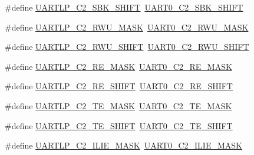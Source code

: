 \begin{DoxyCompactItemize}
\item 
\#define \hyperlink{group___backward___compatibility___symbols_ga7753cf443cbaa9e904cbd69211913709}{U\+A\+R\+T\+L\+P\+\_\+\+C2\+\_\+\+S\+B\+K\+\_\+\+S\+H\+I\+FT}~\hyperlink{group___u_a_r_t0___register___masks_gaa10ba8ef529e39693f0e8101fdec07fc}{U\+A\+R\+T0\+\_\+\+C2\+\_\+\+S\+B\+K\+\_\+\+S\+H\+I\+FT}
\item 
\#define \hyperlink{group___backward___compatibility___symbols_ga23425daa820ed95ebe0509a11b31712a}{U\+A\+R\+T\+L\+P\+\_\+\+C2\+\_\+\+R\+W\+U\+\_\+\+M\+A\+SK}~\hyperlink{group___u_a_r_t0___register___masks_gae7b3477741c9fb0783930456da17ac03}{U\+A\+R\+T0\+\_\+\+C2\+\_\+\+R\+W\+U\+\_\+\+M\+A\+SK}
\item 
\#define \hyperlink{group___backward___compatibility___symbols_ga7e3babc97f1d54f154097c1c3c7f9c13}{U\+A\+R\+T\+L\+P\+\_\+\+C2\+\_\+\+R\+W\+U\+\_\+\+S\+H\+I\+FT}~\hyperlink{group___u_a_r_t0___register___masks_ga2b35477c4d08786d549ff1908f1571e7}{U\+A\+R\+T0\+\_\+\+C2\+\_\+\+R\+W\+U\+\_\+\+S\+H\+I\+FT}
\item 
\#define \hyperlink{group___backward___compatibility___symbols_ga2e5e77f4d10c7c781b36e3d7083daa97}{U\+A\+R\+T\+L\+P\+\_\+\+C2\+\_\+\+R\+E\+\_\+\+M\+A\+SK}~\hyperlink{group___u_a_r_t0___register___masks_gac49427a605bbd952edc2790821b19161}{U\+A\+R\+T0\+\_\+\+C2\+\_\+\+R\+E\+\_\+\+M\+A\+SK}
\item 
\#define \hyperlink{group___backward___compatibility___symbols_ga7d8e4d4ef51751e7d193373f71e86458}{U\+A\+R\+T\+L\+P\+\_\+\+C2\+\_\+\+R\+E\+\_\+\+S\+H\+I\+FT}~\hyperlink{group___u_a_r_t0___register___masks_ga9b0dc4fdd0de7040c2aa8746f9b0465e}{U\+A\+R\+T0\+\_\+\+C2\+\_\+\+R\+E\+\_\+\+S\+H\+I\+FT}
\item 
\#define \hyperlink{group___backward___compatibility___symbols_ga418096fb8e70f64bd1f159cc2e05ce37}{U\+A\+R\+T\+L\+P\+\_\+\+C2\+\_\+\+T\+E\+\_\+\+M\+A\+SK}~\hyperlink{group___u_a_r_t0___register___masks_ga78c914234e9656aaa12582b408a31e64}{U\+A\+R\+T0\+\_\+\+C2\+\_\+\+T\+E\+\_\+\+M\+A\+SK}
\item 
\#define \hyperlink{group___backward___compatibility___symbols_gab5644d9346e8b389fe0c4b750f16e01e}{U\+A\+R\+T\+L\+P\+\_\+\+C2\+\_\+\+T\+E\+\_\+\+S\+H\+I\+FT}~\hyperlink{group___u_a_r_t0___register___masks_gadde2643c4aa03640ab1cf95ba8e07176}{U\+A\+R\+T0\+\_\+\+C2\+\_\+\+T\+E\+\_\+\+S\+H\+I\+FT}
\item 
\#define \hyperlink{group___backward___compatibility___symbols_ga4be20f5bad98489c568fb934dcd22d87}{U\+A\+R\+T\+L\+P\+\_\+\+C2\+\_\+\+I\+L\+I\+E\+\_\+\+M\+A\+SK}~\hyperlink{group___u_a_r_t0___register___masks_ga10be4cac887b9aa3c11bbfef25808578}{U\+A\+R\+T0\+\_\+\+C2\+\_\+\+I\+L\+I\+E\+\_\+\+M\+A\+SK}

\end{DoxyCompactItemize}
